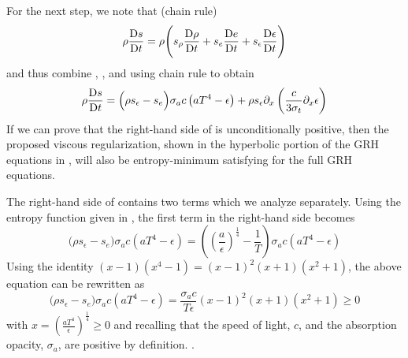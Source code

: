 \documentclass[times]{fldauth}
\begin{document}
\noindent
For the next step, we note that (chain rule)
%
\begin{equation}
\rho \frac{\textrm{D} s}{\textrm{D} t} = \rho \Bigg( s_\rho \frac{\textrm{D} \rho}{\textrm{D} t} + s_e \frac{\textrm{D} e}{\textrm{D} t} +s_\epsilon \frac{\textrm{D} \epsilon}{\textrm{D} t} \Bigg)
\end{equation}
%
and thus combine , , and  using chain rule to obtain
%
\begin{equation} \label{eq:entro_eq_all_terms}
\rho \frac{\textrm{D} s}{\textrm{D} t} = \Big( \rho s_\epsilon -s_e \Big)  \sigma_a c \left( a T^4 - \epsilon \right) +   \rho s_\epsilon \partial_x \left( \frac{c}{3 \sigma_t} \partial_x \epsilon \right) 
\end{equation}
%
If we can prove that the right-hand side of  is unconditionally positive, then the proposed 
viscous regularization, shown in the hyperbolic portion of the GRH equations in , 
will also be entropy-minimum satisfying for the full GRH equations. 

The right-hand side of  contains two terms which we analyze separately. 
Using the entropy function given in , the first term in the right-hand side becomes
%
\begin{equation} 
\Big( \rho s_\epsilon -s_e \Big)  \sigma_a c \left( a T^4 - \epsilon \right) 
= \left( \left( \frac{a}{\epsilon}\right)^\frac{1}{4} - \frac{1}{T} \right)   \sigma_a c \left( a T^4 - \epsilon \right) 
\end{equation}
Using the identity $(x-1)(x^4-1) = (x-1)^2(x+1)(x^2+1)$, the above equation can be rewritten as
\begin{equation} 
\Big( \rho s_\epsilon -s_e \Big)  \sigma_a c \left( a T^4 - \epsilon \right) 
= \frac{\sigma_a c}{T \epsilon}  (x-1)^2(x+1)(x^2+1) \geq 0
\end{equation}
%
with $x=  \left(\frac{aT^4}{\epsilon}\right)^\frac{1}{4} \geq 0$ and recalling that the speed of light, $c$,
and the absorption opacity, $\sigma_a$, are positive by definition. .
\end{document}
